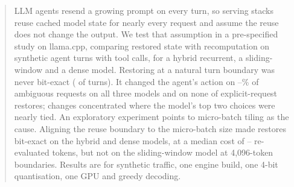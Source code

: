 \begin{abstract}
LLM agents resend a growing prompt on every turn, so serving stacks reuse
cached model state for nearly every request and assume the reuse does not
change the output. We test that assumption in a pre-specified study on
llama.cpp, comparing restored state with recomputation on \TurnsPerModel{}
synthetic agent turns with tool calls, for a hybrid recurrent, a sliding-window
and a dense model. Restoring at a natural turn boundary was never bit-exact
(\NatInexact{} of \NatTurns{} turns). It changed the agent's action on
\ASparkNatShortAmbPct--\AOrnithNatLongAmbPct\% of ambiguous requests on all
three models and on none of \ExplicitRestores{} explicit-request restores;
changes concentrated where the model's top two choices were nearly tied. An
exploratory experiment points to micro-batch tiling as the cause. Aligning the
reuse boundary to the micro-batch size made restores bit-exact on the hybrid
and dense models, at a median cost of \SnapCostMin--\SnapCostMax{}
re-evaluated tokens, but not on the sliding-window model at 4{,}096-token
boundaries. Results are for synthetic traffic, one engine build, one 4-bit
quantisation, one GPU and greedy decoding.
\end{abstract}

